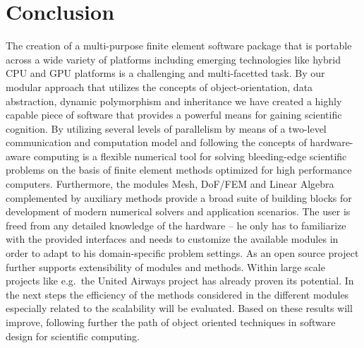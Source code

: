 \section{Conclusion}

The creation of a multi-purpose finite element software package that is
portable across a wide variety of platforms including emerging technologies
like hybrid CPU and GPU platforms is a challenging and multi-facetted task.
By our modular approach that utilizes the concepts of object-orientation, data
abstraction, dynamic polymorphism and inheritance we have created a highly
capable piece of software that provides a powerful means for gaining scientific
cognition. By utilizing several levels of parallelism by means of a two-level
communication and computation model and following the concepts of hardware-aware
computing \hiflow{} is a flexible numerical tool for solving bleeding-edge
scientific problems on the basis of finite element methods optimized for high
performance computers. Furthermore, the modules Mesh, DoF/FEM and Linear
Algebra complemented by auxiliary methods provide a broad suite of
building blocks for development of modern numerical solvers and application
scenarios. The user is freed from any detailed knowledge of the hardware -- he
only has to familiarize with the provided interfaces and needs to customize the
available modules in order to adapt \hiflow{} to his domain-specific problem
settings. As an open source project \hiflow{} further supports extensibility
of modules and methods. Within large scale projects like e.g.~the United Airways
project \hiflow{} has already proven its potential. In the next steps the efficiency
of the methods considered in the different modules especially related to the scalability
will be evaluated. Based on these results \hiflow{} will improve, following further 
the path of object oriented techniques in software design for scientific computing.
